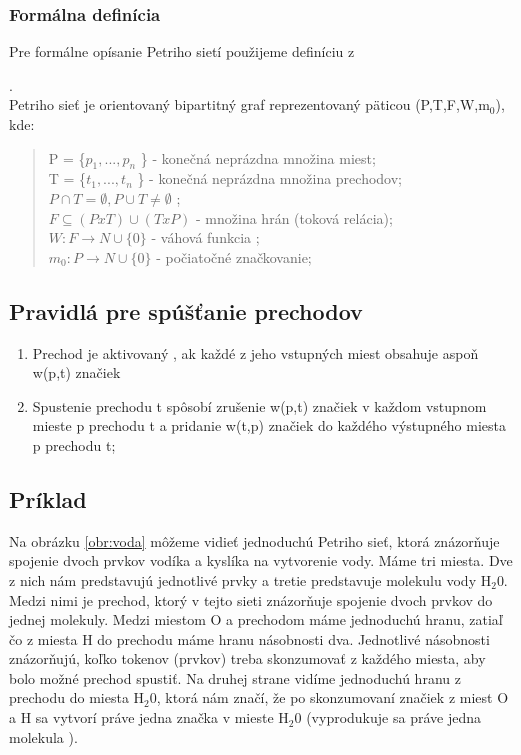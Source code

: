 \subsubsection*{Formálna definícia}
Pre formálne opísanie Petriho sietí použijeme definíciu z \cite{Modelovacie_formalizmy}

.\\
Petriho sieť je orientovaný bipartitný graf reprezentovaný päticou (P,T,F,W,m$_{0}$), kde:\\
\begin{quotation}
	\noindent P = \{$ p_{1}, ... ,p_{n}$ \} - konečná neprázdna množina miest;\\
	T = \{$ t_{1}, ... ,t_{n}$ \} - konečná neprázdna množina prechodov;\\
	{$ P \cap T = \emptyset,P \cup T \neq \emptyset $ }; \\
	{$ F\subseteq ( P x T ) \cup (T x P)$}  - množina hrán (toková relácia);\\
	{$ W : F \rightarrow N \cup \{ 0\}$} - váhová funkcia ;\\
	{$ m_{0} : P \rightarrow N \cup \{ 0\}$} - počiatočné značkovanie;\\
\end{quotation}

\subsection{Pravidlá pre spúšťanie prechodov}
\begin{enumerate}
	\item Prechod je aktivovaný , ak každé z jeho vstupných miest obsahuje aspoň w(p,t) značiek
	\item Spustenie prechodu t spôsobí zrušenie w(p,t) značiek v každom vstupnom mieste p prechodu t a pridanie w(t,p) značiek do každého výstupného miesta p prechodu t;	
\end{enumerate}


\subsection{Príklad}
Na obrázku \ref{obr:voda} môžeme vidieť jednoduchú Petriho sieť, ktorá znázorňuje spojenie dvoch prvkov vodíka a kyslíka na vytvorenie vody. Máme tri miesta. Dve z nich nám predstavujú jednotlivé prvky a tretie predstavuje molekulu vody H$_{2} $0. Medzi nimi je prechod, ktorý v tejto sieti znázorňuje spojenie dvoch prvkov do jednej molekuly. Medzi miestom O a prechodom máme jednoduchú hranu, zatiaľ čo z miesta H do prechodu máme hranu násobnosti dva. Jednotlivé násobnosti znázorňujú, koľko tokenov (prvkov) treba skonzumovať z každého miesta, aby bolo možné prechod spustiť. Na druhej strane vidíme jednoduchú hranu z prechodu do miesta  H$_{2} $0, ktorá nám značí, že po skonzumovaní značiek z miest O a H sa vytvorí práve jedna značka v mieste H$_{2} $0 (vyprodukuje sa práve jedna molekula ). 

